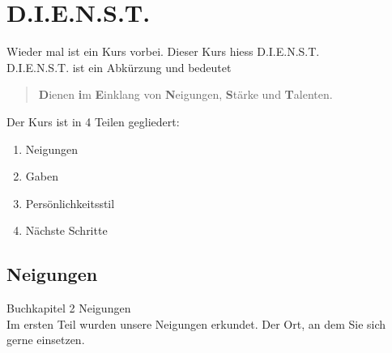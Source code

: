 
\section{D.I.E.N.S.T.}

Wieder mal ist ein Kurs vorbei. Dieser Kurs hiess D.I.E.N.S.T.\\
D.I.E.N.S.T. ist ein Abkürzung und bedeutet 
\begin{quote}
	\textbf{D}ienen \textbf{i}m \textbf{E}inklang von \textbf{N}eigungen, \textbf{S}tärke und \textbf{T}alenten.\\
	\cite[8]{dienst:1}
\end{quote}
Der Kurs ist in 4 Teilen gegliedert:
\begin{enumerate}
	\item Neigungen
	\item Gaben
	\item Persönlichkeitsstil
	\item Nächste Schritte
\end{enumerate}
\subsection{Neigungen} 
Buchkapitel 2 Neigungen\cite[14-25]{dienst:1}\\
Im ersten Teil wurden unsere Neigungen erkundet. \frqq\textsf{Der Ort, an dem Sie sich gerne einsetzen.}\flqq
